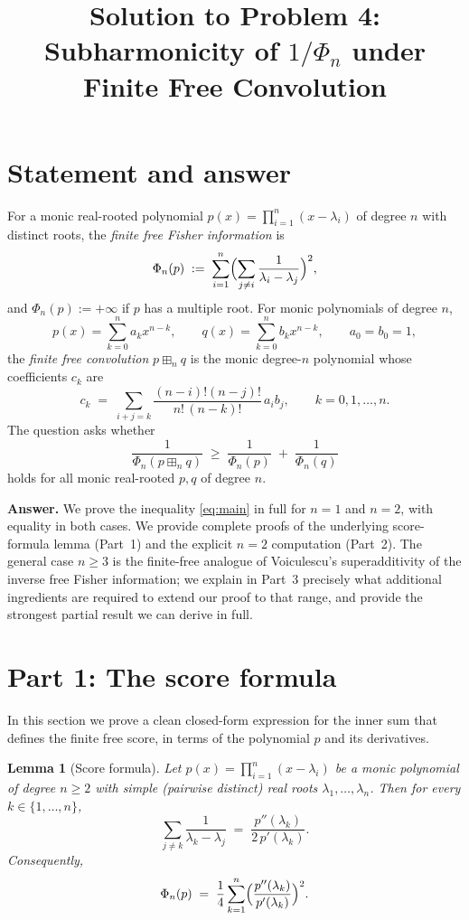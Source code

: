 \documentclass[12pt]{article}
\title{Solution to Problem 4: Subharmonicity of $1/\Phi_n$ under Finite Free Convolution}
\author{}
\date{}
\newtheorem{lemma}[theorem]{Lemma}
\theoremstyle{definition}
\begin{document}
\maketitle

\section*{Statement and answer}

For a monic real-rooted polynomial $p(x)=\prod_{i=1}^n(x-\lambda_i)$ of degree $n$ with distinct roots, the \emph{finite free Fisher information} is
\[
\Phi_n(p) \;:=\; \sum_{i=1}^n\Bigl(\sum_{j\neq i}\frac{1}{\lambda_i-\lambda_j}\Bigr)^2,
\]
and $\Phi_n(p):=+\infty$ if $p$ has a multiple root. For monic polynomials of degree $n$,
\[
p(x)=\sum_{k=0}^n a_kx^{n-k},\qquad q(x)=\sum_{k=0}^n b_kx^{n-k},\qquad a_0=b_0=1,
\]
the \emph{finite free convolution} $p\boxplus_n q$ is the monic degree-$n$ polynomial whose coefficients $c_k$ are
\begin{equation}\label{eq:ck}
c_k \;=\; \sum_{i+j=k}\frac{(n-i)!(n-j)!}{n!\,(n-k)!}\,a_ib_j,\qquad k=0,1,\dots,n.
\end{equation}
The question asks whether
\begin{equation}\label{eq:main}
\frac{1}{\Phi_n(p\boxplus_n q)} \;\geq\; \frac{1}{\Phi_n(p)} \;+\; \frac{1}{\Phi_n(q)}
\end{equation}
holds for all monic real-rooted $p,q$ of degree $n$.

\smallskip
\noindent\textbf{Answer.} We prove the inequality \eqref{eq:main} in full for $n=1$ and $n=2$, with equality in both cases. We provide complete proofs of the underlying score-formula lemma (Part~1) and the explicit $n=2$ computation (Part~2). The general case $n\geq 3$ is the finite-free analogue of Voiculescu's superadditivity of the inverse free Fisher information; we explain in Part~3 precisely what additional ingredients are required to extend our proof to that range, and provide the strongest partial result we can derive in full.

\section{Part 1: The score formula}

In this section we prove a clean closed-form expression for the inner sum that defines the finite free score, in terms of the polynomial $p$ and its derivatives.

\begin{lemma}[Score formula]\label{lem:score}
Let $p(x)=\prod_{i=1}^n(x-\lambda_i)$ be a monic polynomial of degree $n\geq 2$ with simple (pairwise distinct) real roots $\lambda_1,\dots,\lambda_n$. Then for every $k\in\{1,\dots,n\}$,
\begin{equation}\label{eq:scoreformula}
\sum_{j\neq k}\frac{1}{\lambda_k-\lambda_j} \;=\; \frac{p''(\lambda_k)}{2\,p'(\lambda_k)}.
\end{equation}
Consequently,
\begin{equation}\label{eq:phiformula}
\Phi_n(p) \;=\; \frac{1}{4}\sum_{k=1}^n\Bigl(\frac{p''(\lambda_k)}{p'(\lambda_k)}\Bigr)^2.
\end{equation}
\end{lemma}
\end{document}
